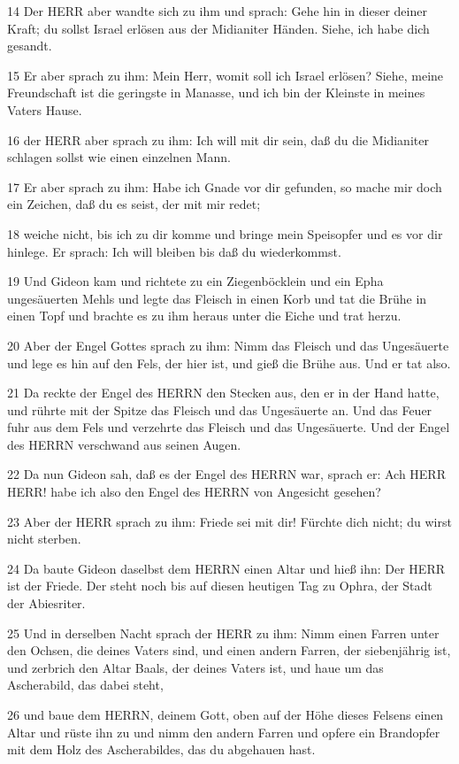 \par 14 Der HERR aber wandte sich zu ihm und sprach: Gehe hin in dieser deiner Kraft; du sollst Israel erlösen aus der Midianiter Händen. Siehe, ich habe dich gesandt.
\par 15 Er aber sprach zu ihm: Mein Herr, womit soll ich Israel erlösen? Siehe, meine Freundschaft ist die geringste in Manasse, und ich bin der Kleinste in meines Vaters Hause.
\par 16 der HERR aber sprach zu ihm: Ich will mit dir sein, daß du die Midianiter schlagen sollst wie einen einzelnen Mann.
\par 17 Er aber sprach zu ihm: Habe ich Gnade vor dir gefunden, so mache mir doch ein Zeichen, daß du es seist, der mit mir redet;
\par 18 weiche nicht, bis ich zu dir komme und bringe mein Speisopfer und es vor dir hinlege. Er sprach: Ich will bleiben bis daß du wiederkommst.
\par 19 Und Gideon kam und richtete zu ein Ziegenböcklein und ein Epha ungesäuerten Mehls und legte das Fleisch in einen Korb und tat die Brühe in einen Topf und brachte es zu ihm heraus unter die Eiche und trat herzu.
\par 20 Aber der Engel Gottes sprach zu ihm: Nimm das Fleisch und das Ungesäuerte und lege es hin auf den Fels, der hier ist, und gieß die Brühe aus. Und er tat also.
\par 21 Da reckte der Engel des HERRN den Stecken aus, den er in der Hand hatte, und rührte mit der Spitze das Fleisch und das Ungesäuerte an. Und das Feuer fuhr aus dem Fels und verzehrte das Fleisch und das Ungesäuerte. Und der Engel des HERRN verschwand aus seinen Augen.
\par 22 Da nun Gideon sah, daß es der Engel des HERRN war, sprach er: Ach HERR HERR! habe ich also den Engel des HERRN von Angesicht gesehen?
\par 23 Aber der HERR sprach zu ihm: Friede sei mit dir! Fürchte dich nicht; du wirst nicht sterben.
\par 24 Da baute Gideon daselbst dem HERRN einen Altar und hieß ihn: Der HERR ist der Friede. Der steht noch bis auf diesen heutigen Tag zu Ophra, der Stadt der Abiesriter.
\par 25 Und in derselben Nacht sprach der HERR zu ihm: Nimm einen Farren unter den Ochsen, die deines Vaters sind, und einen andern Farren, der siebenjährig ist, und zerbrich den Altar Baals, der deines Vaters ist, und haue um das Ascherabild, das dabei steht,
\par 26 und baue dem HERRN, deinem Gott, oben auf der Höhe dieses Felsens einen Altar und rüste ihn zu und nimm den andern Farren und opfere ein Brandopfer mit dem Holz des Ascherabildes, das du abgehauen hast.
